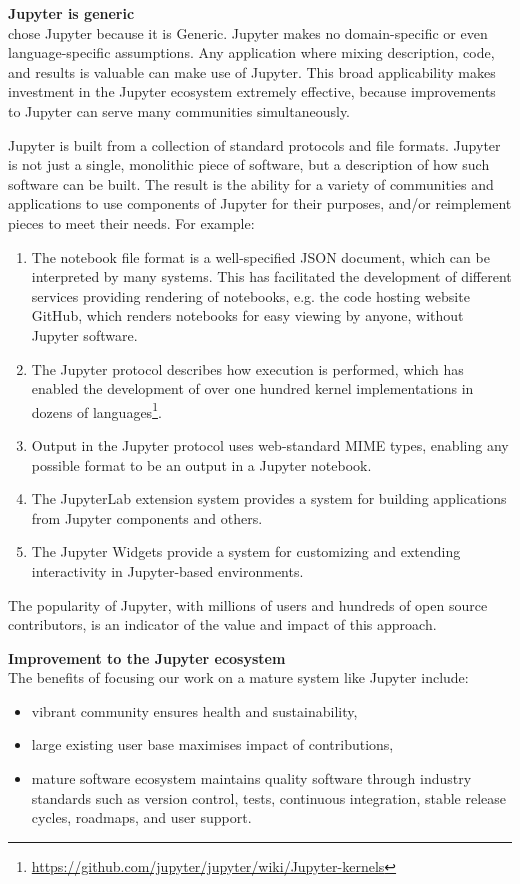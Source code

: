 \medskip
\noindent\textbf{Jupyter is generic}\\
\TheProject chose Jupyter because it is
Generic.  Jupyter makes no domain-specific or even language-specific
assumptions.  Any application where mixing description, code, and
results is valuable can make use of Jupyter.  This broad applicability
makes investment in the Jupyter ecosystem extremely effective, because
improvements to Jupyter can serve many communities simultaneously.

Jupyter is built from a collection of standard protocols and file
formats.  Jupyter is not just a single, monolithic piece of
software, but a description of how such software can be built.  The
result is the ability for a variety of communities and applications to
use components of Jupyter for their purposes, and/or reimplement pieces to
meet their needs.
%
For example:
\begin{enumerate}
\item The notebook file format is a well-specified JSON document,
  which can be interpreted by many systems.  This has facilitated the
  development of different services providing rendering of notebooks, e.g. the code
  hosting website GitHub, which renders notebooks for easy viewing by
  anyone, without Jupyter software.
\item The Jupyter protocol describes how execution is performed, which
  has enabled the development of over one hundred kernel
  implementations in dozens of languages\footnote{\url{https://github.com/jupyter/jupyter/wiki/Jupyter-kernels}}.
\item Output in the Jupyter protocol uses web-standard MIME types,
  enabling any possible format to be an output in a Jupyter notebook.
\item The JupyterLab extension system provides a system for building
  applications from Jupyter components and others.
\item The Jupyter Widgets provide a system for customizing and
  extending interactivity in Jupyter-based environments.
\end{enumerate}

The popularity of Jupyter, with millions of users and hundreds of open
source contributors, is an indicator of the value and impact of this approach.

\medskip
\noindent\textbf{Improvement to the Jupyter ecosystem}\\
The benefits of focusing our work on a mature system like Jupyter include:

\begin{itemize}
\item vibrant community ensures health and sustainability,
\item large existing user base maximises impact of contributions,
\item mature software ecosystem maintains quality software through
  industry standards such as version control, tests, continuous
  integration, stable release cycles, roadmaps, and user support.
\end{itemize}

